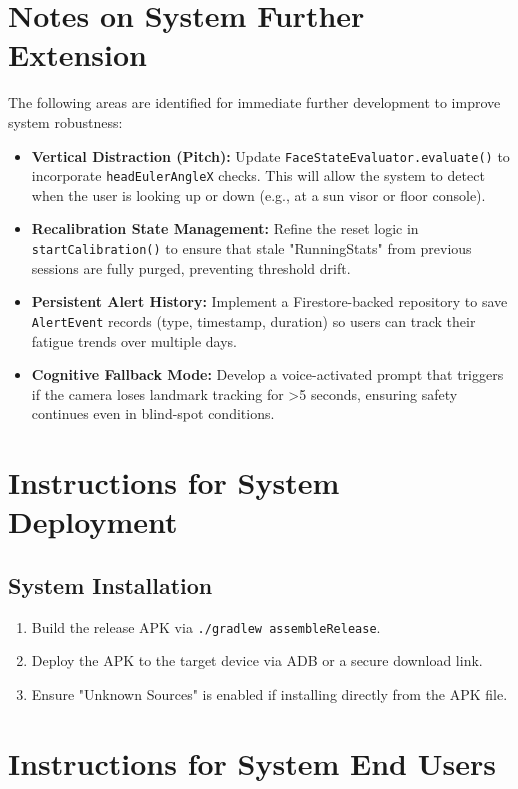 \documentclass[11pt]{report}
\begin{document}
\section{Notes on System Further Extension}
The following areas are identified for immediate further development to improve system robustness:
\begin{itemize}
    \item \textbf{Vertical Distraction (Pitch):} Update \texttt{FaceStateEvaluator.evaluate()} to incorporate \texttt{headEulerAngleX} checks. This will allow the system to detect when the user is looking up or down (e.g., at a sun visor or floor console).
    \item \textbf{Recalibration State Management:} Refine the reset logic in \texttt{startCalibration()} to ensure that stale "RunningStats" from previous sessions are fully purged, preventing threshold drift.
    \item \textbf{Persistent Alert History:} Implement a Firestore-backed repository to save \texttt{AlertEvent} records (type, timestamp, duration) so users can track their fatigue trends over multiple days.
    \item \textbf{Cognitive Fallback Mode:} Develop a voice-activated prompt that triggers if the camera loses landmark tracking for >5 seconds, ensuring safety continues even in blind-spot conditions.
\end{itemize}

\section{Instructions for System Deployment}
\subsection{System Installation}
\begin{enumerate}
    \item Build the release APK via \texttt{./gradlew assembleRelease}.
    \item Deploy the APK to the target device via ADB or a secure download link.
    \item Ensure "Unknown Sources" is enabled if installing directly from the APK file.
\end{enumerate}

\section{Instructions for System End Users}
\end{document}
